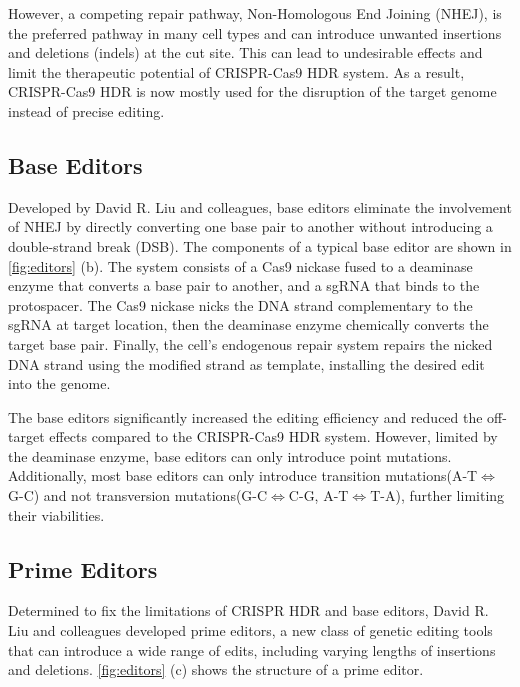 \documentclass[12pt]{article}
\begin{document}
However, a competing repair pathway, Non-Homologous End Joining (NHEJ), is the preferred pathway in many cell types and can introduce unwanted insertions and deletions (indels) at the cut site. This can lead to undesirable effects and limit the therapeutic potential of CRISPR-Cas9 HDR system. As a result, CRISPR-Cas9 HDR is now mostly used for the disruption of the target genome instead of precise editing\cite{kantorCRISPRCas9DNABaseEditing2020}. 

\subsection{Base Editors}

Developed by David R. Liu and colleagues, base editors eliminate the involvement of NHEJ by directly converting one base pair to another without introducing a double-strand break (DSB). The components of a typical base editor are shown in \autoref{fig:editors} (b). The system consists of a Cas9 nickase fused to a deaminase enzyme that converts a base pair to another, and a sgRNA that binds to the protospacer. The Cas9 nickase nicks the DNA strand complementary to the sgRNA at target location, then the deaminase enzyme chemically converts the target base pair. Finally, the cell's endogenous repair system repairs the nicked DNA strand using the modified strand as template, installing the desired edit into the genome\cite{reesBaseEditingPrecision2018}.

The base editors significantly increased the editing efficiency and reduced the off-target effects compared to the CRISPR-Cas9 HDR system. However, limited by the deaminase enzyme, base editors can only introduce point mutations. Additionally, most base editors can only introduce transition mutations(A-T$\iff$G-C) and not transversion mutations(G-C$\iff$C-G, A-T$\iff$T-A), further limiting their viabilities\cite{kantorCRISPRCas9DNABaseEditing2020}.

\subsection{Prime Editors}

Determined to fix the limitations of CRISPR HDR and base editors, David R. Liu and colleagues developed prime editors, a new class of genetic editing tools that can introduce a wide range of edits, including varying lengths of insertions and deletions. \autoref{fig:editors} (c) shows the structure of a prime editor. 
\end{document}
